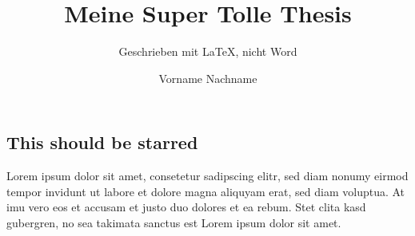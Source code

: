 \documentclass[a4paper,12pt]{report}
\author{Vorname Nachname}
\title{Meine Super Tolle Thesis}
\subtitle{Geschrieben mit \LaTeX , nicht Word}
\begin{document}
\setlength{\parindent}{0pt}
\setlength{\parskip}{1.2ex plus 0.5ex minus 0.2ex}

\hstitlepage

\begin{frontmatter}


\chapter*{This should be starred}
Lorem ipsum dolor sit amet, consetetur sadipscing elitr, sed diam nonumy eirmod tempor invidunt ut labore et dolore magna aliquyam erat, sed diam voluptua. At \gls{imu} vero eos et accusam et justo duo dolores et ea rebum. Stet clita kasd gubergren, no sea takimata sanctus est Lorem ipsum dolor sit amet.

\tableofcontents

\end{frontmatter}


\printbibliography[heading=bibintoc, title={Literatur}]
\cleardoublepage
{}

\listoftables
\cleardoublepage
{}

\listoffigures

\printglossaries

\end{document}
